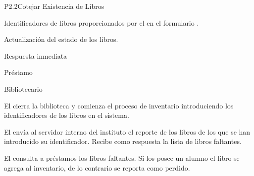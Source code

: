 \begin{Proceso}{P2.2}{Cotejar Existencia de Libros}
   { %
  	\begin{UClist}
  		\UCli Identificadores de libros proporcionados por el  en el formulario . 
     	
    \end {UClist}
  }
  
   { %
  }

   { %
    \begin{UClist}
		\UCli	Actualización del estado de los libros.
    \end{UClist}
  }

   { %
  }

   { %
    \begin{UClist}
      \UCli Respuesta inmediata
    \end{UClist}
  }
   { %
  	    \begin{UClist}
  	    	\UCli Préstamo
  	    \end{UClist}
  }


\end{Proceso}
\begin{PDescripcion}

  \Ppaso Bibliotecario
	\begin{enumerate}
		\Ppaso[\itarea]  El  cierra la biblioteca y comienza el proceso de inventario introduciendo los identificadores de los libros en el sistema.
		
		\Ppaso[\itarea]  El  envía al servidor interno del instituto el reporte de los libros de los que se han introducido su identificador. Recibe como respuesta la lista de libros faltantes.
		
		\Ppaso[\itarea]  El  consulta a préstamos los libros faltantes. Si los posee un alumno el libro se agrega al inventario, de lo contrario se reporta como perdido.
	\end{enumerate}
\end{PDescripcion}




